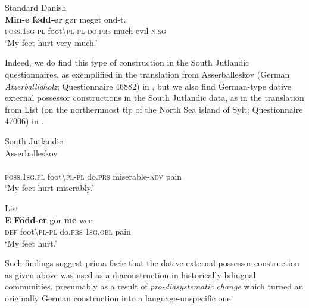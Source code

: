 \documentclass[output=paper]{langsci/langscibook}
\begin{document}
\ea\label{ex:hoeder:23}
	Standard Danish\\
	\gll \textbf{Min-e} \textbf{fødd-er} gør meget ond-t.\\
     \textsc{poss.1sg-pl} foot{\textbackslash}\textsc{pl-pl} \textsc{do.prs} much evil-\textsc{n.sg}\\
	\glt `My feet hurt very much.'
\z

Indeed, we do find this type of construction in the South Jutlandic questionnaires, as exemplified in the translation from Asserballeskov (German \textit{Atzerballigholz}; Questionnaire 46882) in , but we also find German-type dative external possessor constructions in the South Jutlandic data, as in the translation from List (on the northernmost tip of the North Sea island of Sylt; Questionnaire 47006) in .

\ea\label{ex:hoeder:24}
	South Jutlandic\\
	\ea\label{ex:hoeder:24a}
	Asserballeskov\\
	\\
     \textsc{poss.1sg.pl} foot{\textbackslash}\textsc{pl-pl} do.\textsc{prs} miserable-\textsc{adv} pain\\
	\glt `My feet hurt{} miserably.'

	\ex\label{ex:hoeder:24b}
	List\\
	\gll \textbf{E} \textbf{Född-er} gör \textbf{me} wee\\
     \textsc{def} foot{\textbackslash}\textsc{pl-pl}{} do.\textsc{prs} \textsc{1sg.obl} pain\\
	\glt `My feet hurt.'
	\z
\z

Such findings suggest prima facie that the dative external possessor construction as given above was used as a diaconstruction in historically bilingual communities, presumably as a result of \textit{pro-diasystematic}{ }\textit{change} which turned an originally German construction into a language-unspecific one.
\end{document}
